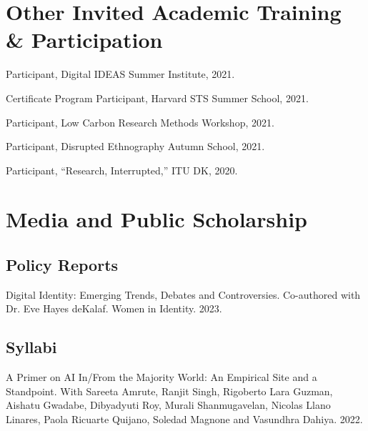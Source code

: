 \documentclass[11pt,letterpaper]{report}
\newcommand{\listitemspace}{0.25em}
\renewenvironment{itemize}{\begin{list}{}{\setlength{\leftmargin}{0em}\setlength{\parskip}{0em}\setlength{\itemsep}{\listitemspace}\setlength{\parsep}{\listitemspace}}}{\end{list}}
\begin{document}
    \section*{Other Invited Academic Training \& Participation}
    \begin{itemize}
        \item Participant, Digital IDEAS Summer Institute, 2021.
        \item Certificate Program Participant, Harvard STS Summer School, 2021.
        \item Participant, Low Carbon Research Methods Workshop, 2021.
        \item Participant, Disrupted Ethnography Autumn School, 2021.
        \item Participant, “Research, Interrupted,” ITU DK, 2020.
    \end{itemize}

    \section*{Media and Public Scholarship}
    \subsection*{Policy Reports}
    \begin{itemize}
        \item Digital Identity: Emerging Trends, Debates and Controversies. Co-authored with Dr. Eve Hayes deKalaf. Women in Identity. 2023.
    \end{itemize}
    \subsection*{Syllabi}
    \begin{itemize}
        \item A Primer on AI In/From the Majority World: An Empirical Site and a Standpoint. With Sareeta Amrute, Ranjit Singh, Rigoberto Lara Guzman, Aishatu Gwadabe, Dibyadyuti Roy, Murali Shanmugavelan, Nicolas Llano Linares, Paola Ricuarte Quijano, Soledad Magnone and Vasundhra Dahiya. 2022.
    \end{itemize}
\end{document}
